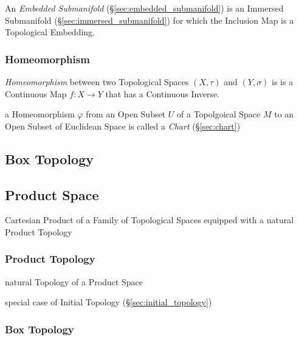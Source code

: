 An \emph{Embedded Submanifold} (\S\ref{sec:embedded_submanifold}) is an
Immersed Submanifold (\S\ref{sec:immersed_submanifold}) for which the Inclusion
Map is a Topological Embedding.



\subsubsection{Homeomorphism}\label{sec:homeomorphism}

\emph{Homeomorphism} between two Topological Spaces $(X, \tau)$ and
$(Y, \sigma)$ is is a Continuous Map $f : X \rightarrow Y$ that has a
Continuous Inverse.

a Homeomorphism $\varphi$ from an Open Subset $U$ of a Topolgoical Space $M$ to
an Open Subset of Euclidean Space is called a \emph{Chart} (\S\ref{sec:chart})



\subsection{Box Topology}\label{sec:box_topology}

\subsection{Product Space}\label{sec:product_space}

Cartesian Product of a Family of Topological Spaces equipped with a natural
Product Topology



\subsubsection{Product Topology}\label{sec:product_topology}

natural Topology of a Product Space

special case of Initial Topology (\S\ref{sec:initial_topology})



\subsubsection{Box Topology}\label{sec:box_topology}

